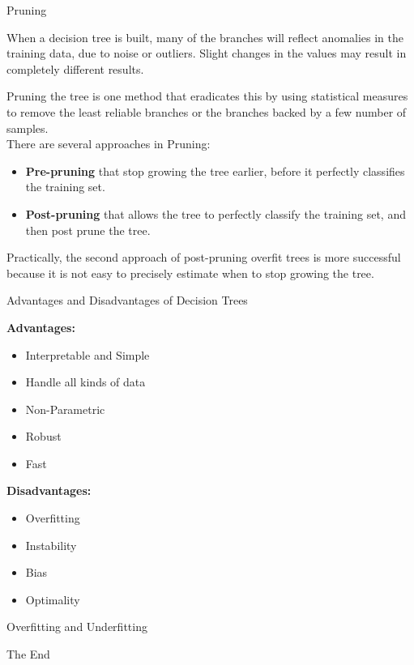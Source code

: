 \documentclass{beamer}
\begin{document}
\begin{frame}{Pruning}
	\begin{flushleft}
	When a decision tree is built, many of the branches will reflect anomalies in the training data, due to noise or outliers. Slight changes in the values may result in completely different results.

Pruning the tree is one method that eradicates this by using statistical measures to remove the least reliable branches or the branches backed by a few number of samples.
\\
\vspace{10pt}
There are several approaches in Pruning:
\begin{itemize} 		
	\item \textbf{Pre-pruning} that stop growing the tree earlier, before it perfectly classifies the training set.
	\item \textbf{Post-pruning} that allows the tree to perfectly classify the training set, and then post prune the tree. 
\end{itemize}
Practically, the second approach of post-pruning overfit trees is more successful because it is not easy to precisely estimate when to stop growing the tree. 
	\end{flushleft}
\end{frame}
\begin{frame}{Advantages and Disadvantages of Decision Trees}
	\begin{flushleft}
		\textbf{Advantages:}
		\begin{itemize} 		
			\item Interpretable and Simple
			\item Handle all kinds of data
			\item Non-Parametric
			\item Robust
			\item Fast
		\end{itemize}
		\textbf{Disadvantages:}
		\begin{itemize} 		
			\item Overfitting
			\item Instability
			\item Bias
			\item Optimality
		\end{itemize}
	\end{flushleft}
\end{frame}
\begin{frame}{Overfitting and Underfitting}
	
\end{frame}
\begin{frame}
\huge{\centerline{The End}}
\end{frame}
\end{document}
